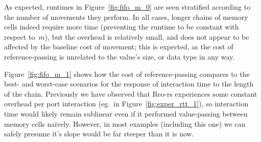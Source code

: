 As expected, runtimes in Figure~\ref{fig:fifo_m_0} are seen stratified according to the number of movements they perform. In all cases, longer chains of memory cells indeed require more time (preventing the runtime to be constant with respect to~$m$), but the overhead is relatively small, and does not appear to be affected by the baseline cost of movement; this is expected, as the cost of reference-passing is unrelated to the value's size, or data type in any way.

Figure~\ref{fig:fifo_m_1} shows how the cost of reference-passing compares to the best- and worst-case scenarios for the response of interaction time to the length of the chain. Previously we have observed that Reo-rs experiences some constant overhead per port interaction (eg.\ in Figure~\ref{fig:exper_rtt_1}), so interaction time would likely remain sublinear even if it performed value-passing between memory cells na\"ively. However, in most examples (including this one) we can safely presume it's slope would be far steeper than it is now.


